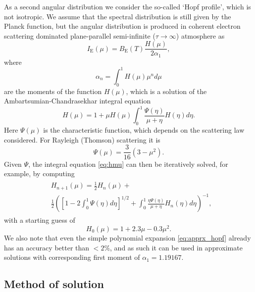 \documentclass[iop, usenatbib]{emulateapj}
\begin{document}
As a second angular distribution we consider the so-called `Hopf profile', which is not isotropic.
We assume that the spectral distribution is still given by the Planck
function, but the angular distribution is produced in coherent electron
scattering dominated plane-parallel semi-infinite ($\tau \rightarrow
\infty$) atmosphere as
\begin{equation}
  I_{\mathrm{E}}(\mu) = B_{\mathrm{E}}(T) \frac{H(\mu)}{2\alpha_1},
\end{equation}
where
\begin{equation}
  \alpha_n = \int_0^1 H(\mu) \mu^n d\mu
\end{equation}
are the moments of the function $H(\mu)$, which is a solution of the Ambartsumian-Chandrasekhar integral equation \citep[see e.g.][]{Cha60,Sob63}
\begin{equation}\label{eq:hmu}
  H(\mu) = 1 + \mu H(\mu) \int_0^1 \frac{\Psi(\eta)}{\mu + \eta} H(\eta) d\eta.
\end{equation}
Here $\Psi(\mu)$ is the characteristic function, which depends on the scattering law considered.
For Rayleigh (Thomson) scattering it is 
\begin{equation}
  \Psi(\mu) = \frac{3}{16}(3-\mu^2).
\end{equation}
Given $\Psi$, the integral equation \eqref{eq:hmu} can then be iteratively solved, for example, by computing
\begin{align}\begin{split}
&H_{n+1}(\mu) =  \frac{1}{2} H_n(\mu) + \\ &\frac{1}{2}\left( \left[1-2\int_0^1 \Psi(\eta)d\eta \right]^{1/2} + \int_0^1 \frac{\eta \Psi(\eta)}{\mu + \eta} H_n(\eta) d\eta \right)^{-1},
\end{split}\end{align}
with a starting guess of
\begin{equation}\label{eq:apprx_hopf}
  H_0(\mu) = 1 + 2.3\mu - 0.3\mu^2.
\end{equation}
We also note that even the simple polynomial expansion
\eqref{eq:apprx_hopf} already has an accuracy better than $<2\%$, and as
such it can be used in approximate solutions with corresponding first moment
of $\alpha_1 = 1.19167$.


\subsection{Method of solution}
\end{document}
